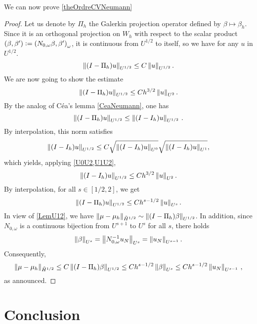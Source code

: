 \documentclass[a4paper]{article}
\begin{document}
\noindent We can now prove \autoref{theOrdreCVNeumann}
\begin{proof}
	Let us denote by $\Pi_h$ the Galerkin projection operator defined by $\beta \mapsto \beta_h$. Since it is an orthogonal projection on $W_h$ with respect to the scalar product $(\beta,\beta') \mathrel{\mathop:}= \left( N_{0,\omega} \beta,\beta'\right)_\omega$, it is continuous from $U^{1/2}$ to itself, so we have for any $u$ in $U^{1/2}$. 
	\[\left\|(I - \Pi_h)u\right\|_{U^{1/2}} \leq C \left\|u\right\|_{U^{1/2}}.\]
	We are now going to show the estimate
	\[\left\|(I - \Pi_h)u\right\|_{U^{1/2}} \leq C h^{3/2} \left\|u\right\|_{U^{2}}.\]
	By the analog of Céa's lemma \autoref{CeaNeumann}, one has 
	\[\left\|(I-\Pi_h)u\right\|_{U^{1/2}} \leq \left\|(I - I_h) u\right\|_{U^{1/2}}\,.\] 
	By interpolation, this norm satisfies
	\[\left\|(I - I_h)u\right\|_{U^{1/2}} \leq C \sqrt{\left\|(I - I_h)u\right\|_{U^{0}}}\sqrt{\left\|(I - I_h)u\right\|_{U^{1}}},\]
	which yields, applying \autoref{U0U2,U1U2},
	\[\left\|(I - I_h)u\right\|_{U^{1/2}} \leq C h^{3/2} \left\|u\right\|_{U^2}.\]
	By interpolation, for all $s \in [1/2,2]$, we get
	\[\left\|(I - \Pi_h)u\right\|_{U^{1/2}} \leq C h^{s - 1/2} \left\|u\right\|_{U^s}.\]
	In view of \autoref{LemU12}, we have $\left\|\mu - \mu_h\right\|_{\tilde{H}^{1/2}} \sim \left\|(I - \Pi_h)\beta\right\|_{U^{1/2}}$. In addition, since $N_{0,\omega}$ is a continuous bijection from $U^{s+1}$ to $U^s$ for all $s$, there holds
	\[\left\|\beta\right\|_{U^s} = \left\|N_{0,\omega}^{-1} u_N\right\|_{U^s} = \left\|u_N\right\|_{U^{s-1}}.\]
	Consequently, 
	\[\left\|\mu - \mu_h\right\|_{\tilde{H}^{1/2}} \leq  C\left\|(I - \Pi_h)\beta\right\|_{U^{1/2}} \leq C h^{s - 1/2} \left\|\beta\right\|_{U^s} \leq C h^{s - 1/2} \left\|u_N\right\|_{U^{s-1}}\,,\]
	as announced. 
\end{proof}


\section{Conclusion}
\end{document}
